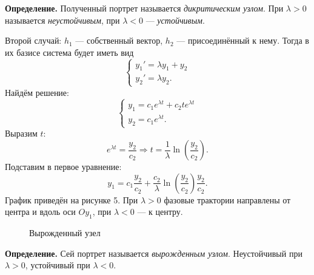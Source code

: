 \textbf{Определение.} Полученный портрет называется \textit{дикритическим узлом}.
При $\lambda > 0$ называется \textit{неустойчивым}, при $\lambda < 0$ --- \textit{устойчивым}.

Второй случай: $h_1$ --- собственный вектор, $h_2$ --- присоединённый к нему.
Тогда в их базисе система будет иметь вид
\[
    \begin{cases}
        y_1' = \lambda y_1 + y_2 \\
        y_2' = \lambda y_2.
    \end{cases}
\]
Найдём решение:
\[
    \begin{cases}
        y_1 = c_1 e^{\lambda t} + c_2 t e^{\lambda t} \\
        y_2 = c_1 e^{\lambda t}.
    \end{cases}
\]
Выразим $t$:
\[
    e^{\lambda t} = \frac{y_2}{c_2} \Rightarrow t = \frac{1}{\lambda} \ln \left( \frac{y_2}{c_2} \right).
\]
Подставим в первое уравнение:
\[
    y_1 = c_1 \frac{y_2}{c_2} + \frac{c_2}{\lambda} \ln \left( \frac{y_2}{c_2} \right) \frac{y_2}{c_2}.
\]
График приведён на рисунке 5. При $\lambda > 0$ фазовые трактории направлены от центра и вдоль оси $Oy_1$, при $\lambda < 0$ --- к центру.

\begin{figure}[ht]
    \centering
    \caption{Вырожденный узел}
\end{figure}

\textbf{Определение.} Сей портрет называется \textit{вырожденным узлом}. Неустойчивый при $\lambda > 0$, устойчивый при $\lambda < 0$.

